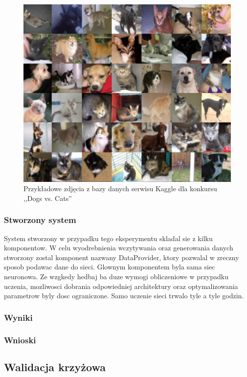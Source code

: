 \begin{figure}[ht!]
\centering
\includegraphics[scale=0.8]{res/catsdogs.png}
\caption[Caption for LOF]{Przykładowe zdjęcia z bazy danych serwisu Kaggle dla konkursu ,,Dogs vs. Cats'' \label{catsdogs}}
\end{figure} 

\subsubsection{Stworzony system}
System stworzony w przypadku tego eksperymentu skladal sie z kilku komponentow. W celu wyodrebnienia wczytywania oraz generowania danych stworzony zostal komponent nazwany DataProvider, ktory pozwalal w zreczny sposob podawac dane do sieci. Glownym komponentem byla sama siec neuronowa. Ze wzgkedy hedbaj ba duze wymogi obliczeniowe w przypadku uczenia, mozliwosci dobrania odpowiedniej architektury oraz optymalizowania parametrow byly dosc ograniczone. Samo uczenie sieci trwalo tyle a tyle godzin.
\subsubsection{Wyniki}
\subsubsection{Wnioski}

\subsection{Walidacja krzyżowa}
